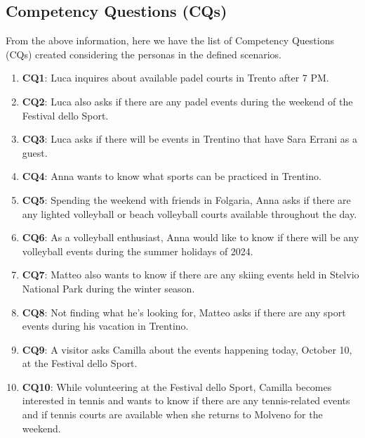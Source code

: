 \subsection{Competency Questions (CQs)}
From the above information, here we have the list of Competency Questions (CQs) created considering the personas in the defined scenarios.
\begin{enumerate} 
    \item \textbf{CQ1}: Luca inquires about available padel courts in Trento after 7 PM.
    \item \textbf{CQ2}: Luca also asks if there are any padel events during the weekend of the Festival dello Sport.
    \item \textbf{CQ3}: Luca asks if there will be events in Trentino that have Sara Errani as a guest.
    \item \textbf{CQ4}: Anna wants to know what sports can be practiced in Trentino.
    \item \textbf{CQ5}: Spending the weekend with friends in Folgaria, Anna asks if there are any lighted volleyball or beach volleyball courts available throughout the day.
    \item \textbf{CQ6}: As a volleyball enthusiast, Anna would like to know if there will be any volleyball events during the summer holidays of 2024.
    \item \textbf{CQ7}: Matteo also wants to know if there are any skiing events held in Stelvio National Park during the winter season.
    \item \textbf{CQ8}: Not finding what he’s looking for, Matteo asks if there are any sport events during his vacation in Trentino.
    \item \textbf{CQ9}: A visitor asks Camilla about the events happening today, October 10, at the Festival dello Sport.
    \item \textbf{CQ10}: While volunteering at the Festival dello Sport, Camilla becomes interested in tennis and wants to know if there are any tennis-related events and if tennis courts are available when she returns to Molveno for the weekend. 
\end{enumerate}

